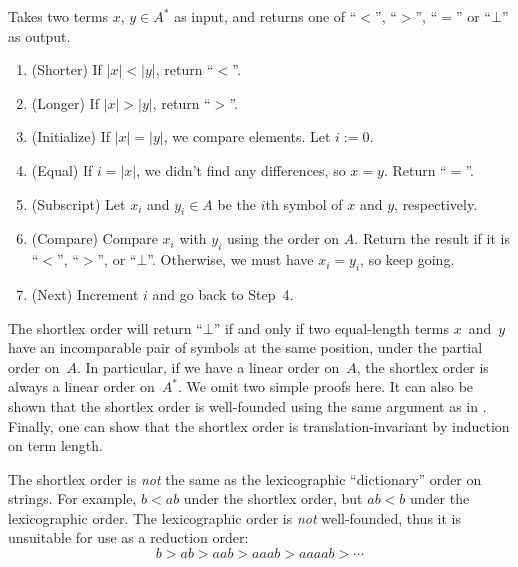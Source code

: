 \documentclass[../generics]{subfiles}
\begin{document}
\begin{algorithm}\label{shortlex}
Takes two terms $x$, $y\in A^*$ as input, and returns one of ``$<$'', ``$>$'', ``$=$'' or \index{$\bot$}``$\bot$'' as output.
\begin{enumerate}
\item (Shorter) If $|x|<|y|$, return ``$<$''.
\item (Longer) If $|x|>|y|$, return ``$>$''.
\item (Initialize) If $|x|=|y|$, we compare elements. Let $i:=0$.
\item (Equal) If $i=|x|$, we didn't find any differences, so $x=y$. Return ``$=$''.
\item (Subscript) Let $x_i$ and $y_i\in A$ be the $i$th symbol of $x$ and $y$, respectively.
\item (Compare) Compare $x_i$ with $y_i$ using the order on $A$. Return the result if it is ``$<$'', ``$>$'', or ``$\bot$''. Otherwise, we must have $x_i=y_i$, so keep going.
\item (Next) Increment $i$ and go back to Step~4.
\end{enumerate}
\end{algorithm}
The shortlex order will return ``$\bot$'' if and only if two equal-length terms $x$~and~$y$ have an incomparable pair of symbols at the same position, under the partial order on~$A$. In particular, if we have a linear order on~$A$, the shortlex order is always a linear order on~$A^*$. We omit two simple proofs here. It can also be shown that the shortlex order is well-founded using the same argument as in . Finally, one can show that the shortlex order is translation-invariant by induction on term length.

\begin{example}
The shortlex order is \emph{not} the same as the lexicographic ``dictionary'' order on strings. For example, $b<ab$ under the shortlex order, but $ab<b$ under the lexicographic order. The lexicographic order is \emph{not} well-founded, thus it is unsuitable for use as a reduction order:
\[b>ab>aab>aaab>aaaab>\cdots\]
\end{example}
\end{document}
